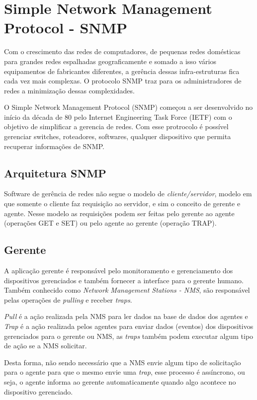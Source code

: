 \documentclass[12pt, brazil, ruledheader, pnumromarab,normaltoc]{abnt}
\begin{document}
\section{Simple Network Management Protocol - SNMP} \label{sec:snmp}
Com o crescimento das redes de computadores, de pequenas redes domésticas para grandes redes espalhadas geograficamente e somado a isso vários equipamentos de fabricantes diferentes, a gerência dessas infra-estruturas fica cada vez mais complexas. O protocolo SNMP traz para os administradores de redes a minimização dessas complexidades.
\par
O Simple Network Management Protocol (SNMP) começou a ser desenvolvido no início da década de 80 pelo Internet Engineering Task Force (IETF) com o objetivo de simplificar a gerencia de redes. Com esse protrocolo é possível gerenciar switches, roteadores, softwares, qualquer dispositivo que permita recuperar informações de SNMP.

\subsection{Arquitetura SNMP}
Software de gerência de redes não segue o modelo de \emph{cliente/servidor}, modelo em que somente o cliente faz requisição ao servidor, e sim o conceito de gerente e agente. Nesse modelo as requisições podem ser feitas pelo gerente ao agente (operações GET e SET) ou pelo agente ao gerente (operação TRAP).

\subsection{Gerente}
A aplicação gerente é responsável pelo monitoramento e gerenciamento dos dispositivos gerenciados e também fornecer a interface para o gerente humano. Também conhecido como \emph{Network Management Stations - NMS}, são responsável pelas operações de \emph{pulling} e receber \emph{traps}.
\par
\emph{Pull} é a ação realizada pela NMS para ler dados na base de dados dos agentes e \emph{Trap} é a ação realizada pelos agentes para enviar dados (eventos) dos dispositivos gerenciados para o gerente ou NMS, as \emph{traps} também podem executar algum tipo de ação se a NMS solicitar.
\par Desta forma, não sendo necessário que a NMS envie algum tipo de solicitação para o agente para que o mesmo envie uma \emph{trap}, esse processo é assíncrono, ou seja, o agente informa ao gerente automaticamente quando algo acontece no dispositivo gerenciado.
\end{document}
